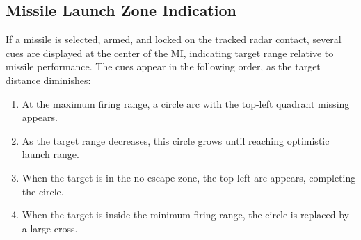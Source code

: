\subsection{Missile Launch Zone Indication}
If a missile is selected, armed, and locked on the tracked radar contact,
several cues are displayed at the center of the MI,
indicating target range relative to missile performance.
The cues appear in the following order, as the target distance diminishes:
\begin{enumerate}[nosep]
  \item At the maximum firing range, a circle arc with the top-left quadrant missing appears.
  \item As the target range decreases, this circle grows until reaching optimistic launch range.
  \item When the target is in the no-escape-zone, the top-left arc appears, completing the circle.
  \item When the target is inside the minimum firing range, the circle is replaced by a large cross.
\end{enumerate}
